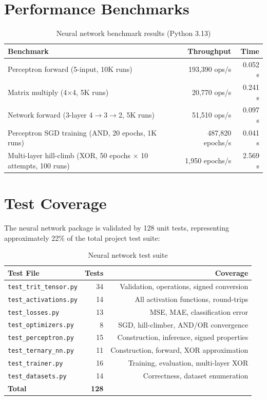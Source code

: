 \documentclass[10pt,a4paper,twoside]{book}
\begin{document}
\section{Performance Benchmarks}

\begin{table}[H]
\centering
\caption{Neural network benchmark results (Python 3.13)}
\label{tab:nnbench}
\begin{tabular}{lrr}
\toprule
Benchmark & Throughput & Time \\
\midrule
Perceptron forward (5-input, 10K runs) & 193,390 ops/s & 0.052 s \\
Matrix multiply (4$\times$4, 5K runs) & 20,770 ops/s & 0.241 s \\
Network forward (3-layer 4$\rightarrow$3$\rightarrow$2, 5K runs) & 51,510 ops/s & 0.097 s \\
Perceptron SGD training (AND, 20 epochs, 1K runs) & 487,820 epochs/s & 0.041 s \\
Multi-layer hill-climb (XOR, 50 epochs $\times$ 10 attempts, 100 runs) & 1,950 epochs/s & 2.569 s \\
\bottomrule
\end{tabular}
\end{table}

\section{Test Coverage}

The neural network package is validated by 128 unit tests, representing
approximately 22\% of the total project test suite:

\begin{table}[H]
\centering
\caption{Neural network test suite}
\label{tab:nntests}
\begin{tabular}{lrr}
\toprule
Test File & Tests & Coverage \\
\midrule
\texttt{test\_trit\_tensor.py} & 34 & Validation, operations, signed conversion \\
\texttt{test\_activations.py} & 14 & All activation functions, round-trips \\
\texttt{test\_losses.py} & 13 & MSE, MAE, classification error \\
\texttt{test\_optimizers.py} & 8 & SGD, hill-climber, AND/OR convergence \\
\texttt{test\_perceptron.py} & 15 & Construction, inference, signed properties \\
\texttt{test\_ternary\_nn.py} & 11 & Construction, forward, XOR approximation \\
\texttt{test\_trainer.py} & 16 & Training, evaluation, multi-layer XOR \\
\texttt{test\_datasets.py} & 14 & Correctness, dataset enumeration \\
\midrule
\textbf{Total} & \textbf{128} & \\
\bottomrule
\end{tabular}
\end{table}
\end{document}
